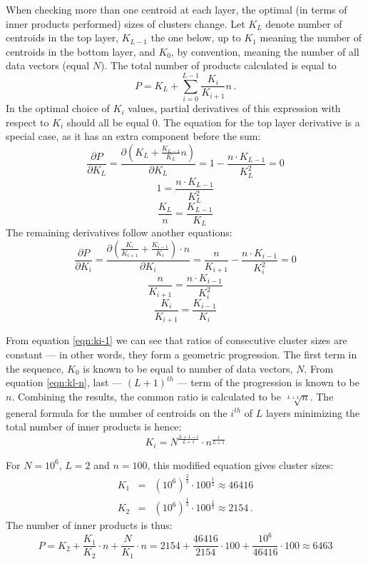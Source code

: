When checking more than one centroid at each layer, the optimal (in terms
of inner products performed) sizes of clusters change. Let $ K_L $ denote
number of centroids in the top layer, $ K_{L-1} $ the one below, up to
$ K_1 $ meaning the number of centroids in the bottom layer, and $ K_0 $, by 
convention, meaning the number of all data vectors (equal $N$). The total number of
products calculated is equal to 
$$ P = K_L + \sum_{i=0}^{L-1} \frac{K_i}{K_{i+1}}  n \,.$$
In the optimal choice of $K_i$ values, partial derivatives of this expression
with respect to $K_i$ should all be equal 0. The equation for the top layer 
derivative is a special case, as it has an extra component before the sum:
$$ 
\frac{\partial P}{\partial K_L} = 
\frac{\partial (K_L + \frac{K_{L-1}}{K_L} n)}{\partial K_L} =
1 -\frac{n \cdot K_{L-1}}{K_L^2} = 
0
$$
$$
1 = \frac{n \cdot K_{L-1}}{K_L^2}
$$
\begin{equation}
\label{eqn:kl-n}
\frac{K_L}{n} = \frac{K_{L-1}}{K_L}
\end{equation}
The remaining derivatives follow another equations:
$$
\frac{\partial P}{\partial K_i} =
\frac{\partial (\frac{K_i}{K_{i+1}} + \frac{K_{i-1}}{K_i}) \cdot n}{\partial K_i} =
\frac{n}{K_{i+1}} - \frac{n \cdot K_{i-1}}{K_i^2} = 0
$$
$$
\frac{n}{K_{i+1}} = \frac{n \cdot K_{i-1}}{K_i^2}
$$
\begin{equation}
\label{eqn:ki-1}
\frac{K_i}{K_{i+1}} = \frac{K_{i-1}}{K_i}
\end{equation}

From equation \ref{eqn:ki-1} we can see that ratios of consecutive cluster sizes are constant --- in other
words, they form a geometric progression. The first term in the sequence,
$K_0$ is known to be equal to number of data vectors, $N$. From equation \ref{eqn:kl-n},
last --- $(L+1)^{th}$ --- term of the progression is known to be $n$. Combining the results,
the common ratio is calculated to be $\sqrt[L+1]{n}$. The general formula
for the number of centroids on the $i^{th}$ of $L$ layers minimizing the total number of
inner products is hence:
$$
K_i = N^{\frac{L+1-i}{L+1}} \cdot n^\frac{i}{L+1}
$$

For $N = 10^6$, $L = 2$ and $n = 100$, this modified equation gives cluster sizes:
\begin{eqnarray*}
K_1 & = & (10^6)^{\frac{2}{3}} \cdot 100^\frac{1}{3} \approx 46416 \\
K_2 & = & (10^6)^{\frac{1}{3}} \cdot 100^\frac{2}{3} \approx 2154 \,.
\end{eqnarray*}
The number of inner products is thus:
$$ 
P = K_2 + \frac{K_1}{K_2} \cdot n + \frac{N}{K_1} \cdot n =
2154 + \frac{46416}{2154} \cdot 100 + \frac{10^6}{46416} \cdot 100 \approx
6463
$$

